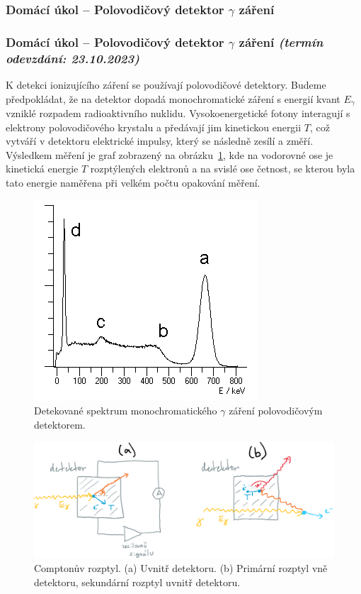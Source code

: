 \documentclass[a4paper,11pt,twoside]{article}
\newenvironment{homework}{}{}
\newcommand{\np}{\clearpage\newpage}
\newcommand{\exercise}[2][]{\ifthenelse{\isempty{#1}}
	{\np\thispagestyle{empty}\subsubsection*{Domácí úkol -- #2}}
	{\np\thispagestyle{empty}\np\subsubsection*{Domácí úkol -- #2 \small{\it{(termín odevzdání: {#1})}}}}
}
\begin{document}
\begin{homework}
	\setcounter{figure}{0}
	\pagestyle{empty}
	\exercise[23.10.2023]{Polovodičový detektor $\gamma$ záření}
	K detekci ionizujícího záření se používají polovodičové detektory.
	Budeme předpokládat, že na detektor dopadá monochromatické záření s energií kvant $E_{\gamma}$ vzniklé rozpadem radioaktivního nuklidu.
	Vysokoenergetické fotony interagují s elektrony polovodičového krystalu a předávají jim kinetickou energii $T$, což vytváří v detektoru elektrické impulsy, který se následně zesílí a změří.
	Výsledkem měření je graf zobrazený na obrázku~\ref{fig:ComptonSpectrum}, kde na vodorovné ose je kinetická energie $T$ rozptýlených elektronů a na svislé ose četnost, se kterou byla tato energie naměřena při velkém počtu opakování měření.

	\begin{figure}[!h]
		\centering
		\includegraphics[width=0.5\linewidth]{ComptonSpectrum.png}
		\caption{Detekované spektrum monochromatického $\gamma$ záření polovodičovým detektorem.}
		\label{fig:ComptonSpectrum}
	\end{figure}        

	\begin{figure}[!h]
		\centering
		\includegraphics[width=0.9\linewidth]{ComptonDetector.png}
		\caption{Comptonův rozptyl. (a) Uvnitř detektoru. (b) Primární rozptyl vně detektoru, sekundární rozptyl uvnitř detektoru.}
		\label{fig:ComptonDetector}
	\end{figure}        


\end{homework}
\end{document}
